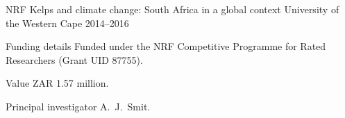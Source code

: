 \begin{cventries}

\cventry
{NRF} %
{Kelps and climate change: South Africa in a global context} %
{University of the Western Cape} %
{2014--2016} %
{ %
\begin{cvdescription}
    \item[Funding details] Funded under the NRF Competitive Programme for Rated Researchers (Grant UID 87755).
    \item[Value] {ZAR 1.57 million.}
    \item[Principal investigator] A.~J.~Smit.
\end{cvdescription}
}

\end{cventries}